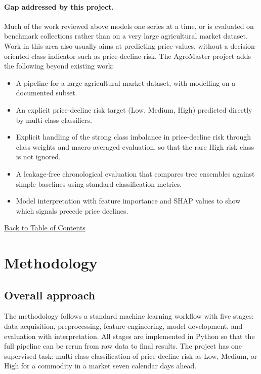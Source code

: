 \documentclass[12pt,a4paper]{article}
\begin{document}
\paragraph{Gap addressed by this project.}
Much of the work reviewed above models one series at a time, or is evaluated on benchmark collections rather than on a very large agricultural market dataset. Work in this area also usually aims at predicting price values, without a decision-oriented class indicator such as price-decline risk. The AgroMaster project adds the following beyond existing work:
\begin{itemize}
    \item A pipeline for a large agricultural market dataset, with modelling on a documented subset.
    \item An explicit price-decline risk target (Low, Medium, High) predicted directly by multi-class classifiers.
    \item Explicit handling of the strong class imbalance in price-decline risk through class weights and macro-averaged evaluation, so that the rare High risk class is not ignored.
    \item A leakage-free chronological evaluation that compares tree ensembles against simple baselines using standard classification metrics.
    \item Model interpretation with feature importance and SHAP values to show which signals precede price declines.
\end{itemize}

\hyperref[contents]{\small Back to Table of Contents}
\newpage
\section{Methodology }

\subsection{Overall approach}
The methodology follows a standard machine learning workflow with five stages: data acquisition, preprocessing, feature engineering, model development, and evaluation with interpretation. All stages are implemented in Python so that the full pipeline can be rerun from raw data to final results. The project has one supervised task: multi-class classification of price-decline risk as Low, Medium, or High for a commodity in a market seven calendar days ahead.
\end{document}
